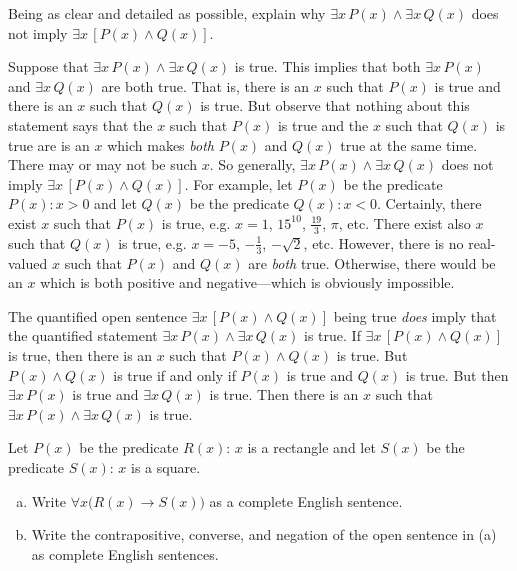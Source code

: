 \documentclass[11pt,letterpaper]{article}
\begin{document}
\newpage



 Being as clear and detailed as possible, explain why $\exists x\, P(x) \wedge \exists x\, Q(x)$ does not imply $\exists x\, [P(x) \wedge Q(x)]$. \pspace

\sol Suppose that $\exists x\, P(x) \wedge \exists x\, Q(x)$ is true. This implies that both $\exists x\, P(x)$ and $\exists x\, Q(x)$ are both true. That is, there is an $x$ such that $P(x)$ is true and there is an $x$ such that $Q(x)$ is true. But observe that nothing about this statement says that the $x$ such that $P(x)$ is true and the $x$ such that $Q(x)$ is true are is an $x$ which makes \textit{both} $P(x)$ and $Q(x)$ true at the same time. There may or may not be such $x$. So generally, $\exists x\, P(x) \wedge \exists x\, Q(x)$ does not imply $\exists x\, [P(x) \wedge Q(x)]$. For example, let $P(x)$ be the predicate $P(x): x > 0$ and let $Q(x)$ be the predicate $Q(x): x < 0$. Certainly, there exist $x$ such that $P(x)$ is true, e.g. $x= 1$, $15^{10}$, $\frac{19}{3}$, $\pi$, etc. There exist also $x$ such that $Q(x)$ is true, e.g. $x= -5$, $-\frac{1}{3}$, $-\sqrt{2}$, etc. However, there is no real-valued $x$ such that $P(x)$ and $Q(x)$ are \textit{both} true. Otherwise, there would be an $x$ which is both positive and negative---which is obviously impossible. \pspace

 The quantified open sentence $\exists x\, [P(x) \wedge Q(x)]$ being true \textit{does} imply that the quantified statement $\exists x\, P(x) \wedge \exists x\, Q(x)$ is true. If $\exists x\, [P(x) \wedge Q(x)]$ is true, then there is an $x$ such that $P(x) \wedge Q(x)$ is true. But $P(x) \wedge Q(x)$ is true if and only if $P(x)$ is true and $Q(x)$ is true. But then $\exists x\, P(x)$ is true and $\exists x\, Q(x)$ is true. Then there is an $x$ such that $\exists x\, P(x) \wedge \exists x\, Q(x)$ is true. 



\newpage



 Let $P(x)$ be the predicate $R(x)$: $x$ is a rectangle and let $S(x)$ be the predicate $S(x)$: $x$ is a square. 
	\begin{enumerate}[(a)]
	\item Write $\forall x \big( R(x) \to S(x) \big)$ as a complete English sentence.
	\item Write the contrapositive, converse, and negation of the open sentence in (a) as complete English sentences. 
	\end{enumerate} \pspace
\end{document}
